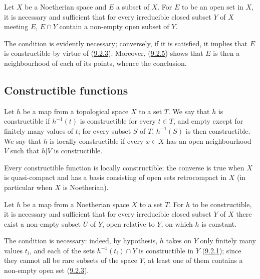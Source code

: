 \begin{corollary}[9.2.6]
\label{0.9.2.6}
Let $X$ be a Noetherian space and $E$ a subset of $X$. For $E$ to be an
open set in $X$, it is necessary and sufficient that for every irreducible
closed subset $Y$ of $X$ meeting $E$, $E\cap Y$ contain a non-empty
open subset of $Y$.
\end{corollary}

The condition is evidently necessary; conversely, if it is satisfied,
it implies that $E$ is constructible by virtue of
(\hyperref[0.9.2.3]{9.2.3}). Moreover,
(\hyperref[0.9.2.5]{9.2.5}) shows that $E$ is then a neighbourhood of each
of its points, whence the conclusion.

\subsection{Constructible functions}
\label{subsection:0.9.3}

\begin{definition}[9.3.1]
\label{0.9.3.1}
Let $h$ be a map from a topological space $X$ to a set $T$.
We say that $h$ is constructible if $h^{-1}(t)$ is constructible for
every $t\in T$, and empty except for finitely many values of $t$; for
every subset $S$ of $T$, $h^{-1}(S)$ is then constructible. We say that $h$
is locally constructible if every $x\in X$ has an open
neighbourhood $V$ such that $h|V$ is constructible.
\end{definition}

Every constructible function is locally constructible; the converse
is true when $X$ is quasi-compact and has a basis consisting of
open sets retrocompact in $X$ (in particular when $X$ is Noetherian).

\begin{proposition}[9.3.2]
\label{0.9.3.2}
Let $h$ be a map from a Noetherian space $X$ to a set $T$.
For $h$ to be constructible, it is necessary and sufficient that for every
irreducible closed subset $Y$ of $X$ there exist a non-empty subset $U$ of
$Y$, open relative to $Y$, on which $h$ is constant.
\end{proposition}

The condition is necessary: indeed, by hypothesis, $h$ takes on $Y$
only finitely many values $t_i$, and each of the sets
$h^{-1}(t_i)\cap Y$ is constructible in $Y$
(\hyperref[0.9.2.1]{9.2.1}); since they cannot all be rare subsets
of the space $Y$, at least one of them contains a non-empty open set
(\hyperref[0.9.2.3]{9.2.3}).

